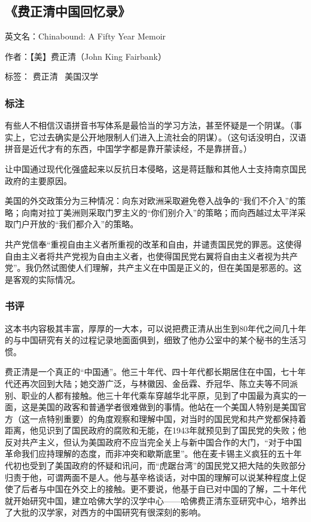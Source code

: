 \subsection{《费正清中国回忆录》}

英文名：Chinabound: A Fifty Year Memoir

作者：【美】费正清（John King Fairbank）

标签： 费正清 \ 美国汉学 

\subsubsection{标注}
有些人不相信汉语拼音书写体系是最恰当的学习方法，甚至怀疑是一个阴谋。（事实上，它过去确实是公开地限制人们进入上流社会的阴谋）。（这句话没明白，汉语拼音是近代才有的东西，中国学字都是靠开蒙读经，不是靠拼音。）

让中国通过现代化强盛起来以反抗日本侵略，这是蒋廷黻和其他人士支持南京国民政府的主要原因。

美国的外交政策分为三种情况：向东对欧洲采取避免卷入战争的“我们不介入”的策略；向南对拉丁美洲则采取门罗主义的“你们别介入”的策略；而向西越过太平洋采取门户开放的“我们都介入”的策略。

共产党信奉“重视自由主义者所重视的改革和自由，并谴责国民党的罪恶。这使得自由主义者将共产党视为自由主义者，也使得国民党右翼将自由主义者视为共产党”。我仍然试图使人们理解，共产主义在中国是正义的，但在美国是邪恶的。这是客观的实际情况。

\subsubsection{书评}

这本书内容极其丰富，厚厚的一大本，可以说把费正清从出生到80年代之间几十年的与中国研究有关的过程记录地面面俱到，细致了他办公室中的某个秘书的生活习惯。

费正清是一个真正的“中国通”。他三十年代、四十年代都长期居住在中国，七十年代还再次回到大陆；她交游广泛，与林徽因、金岳霖、乔冠华、陈立夫等不同派别、职业的人都有接触。他三十年代乘车穿越华北平原，见到了中国最为真实的一面，这是美国的政客和普通学者很难做到的事情。他站在一个美国人特别是美国官方（这一点特别重要）的角度观察和理解中国，对当时的国民党和共产党都保持着距离，他见识到了国民政府的腐败和无能，在1943年就预见到了国民党的失败；他反对共产主义，但认为美国政府不应当完全关上与新中国合作的大门，“对于中国革命我们应持理解的态度，而非冲突和歇斯底里”。他在麦卡锡主义疯狂的五十年代初也受到了美国政府的怀疑和讯问，而“虎踞台湾”的国民党又把大陆的失败部分归责于他，可谓两面不是人。他与基辛格谈话，对中国的理解可以说某种程度上促使了后者与中国在外交上的接触。更不要说，他基于自已对中国的了解，二十年代就开始研究中国，建立哈佛大学的汉学中心——哈佛费正清东亚研究中心，培养出了大批的汉学家，对西方的中国研究有很深刻的影响。

